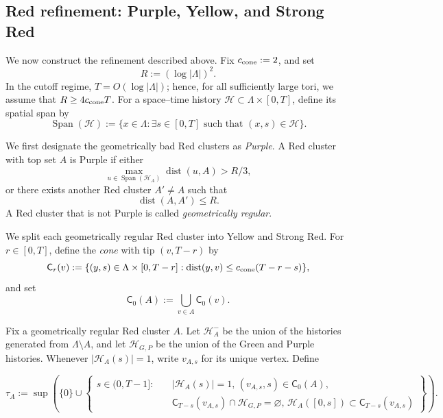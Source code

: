 \documentclass[letterpaper,11pt,reqno]{amsart}
\theoremstyle{definition}
\newcommand{\eset}{\varnothing}
\newcommand{\dist}{\mathrm{dist}}
\begin{document}
\subsection{Red refinement: Purple, Yellow, and Strong Red}
\label{subsec:yellowSR}

We now construct the refinement described above. 
%
Fix
\(c_{\rm cone}:=2\), and set
\[
        R:=(\log|\Lambda|)^2 .
\]
In the cutoff regime,
\(T=O(\log|\Lambda|)\); hence, for all sufficiently large tori, we assume that $R\ge 4c_{\rm cone}T$.
For a space--time history
\(\mathcal H\subset\Lambda\times[0,T]\), define its spatial span by
\[
        \operatorname{Span}(\mathcal H):=
        \{x\in\Lambda:\exists s\in[0,T]\text{ such that }(x,s)\in \mathcal H\}.
\]

We first designate the geometrically bad Red clusters as \emph{Purple}. A Red
cluster with top set \(A\) is Purple if either
\[
\max_{u\in\operatorname{Span}(\mathcal H_A)}
\operatorname{dist}(u,A)>R/3,
\]
or there exists another Red cluster \(A'\neq A\) such that
\[
\operatorname{dist}(A,A')\le R.
\]
A Red cluster that is not Purple is called
\emph{geometrically regular}.

We split each geometrically regular Red cluster into Yellow and Strong Red. For \(r\in[0,T]\), define the \emph{cone} with tip
\((v,T-r)\) by
\[
    \mathsf C_r(v)
    :=
    \{(y,s)\in\Lambda\times[0,T-r]:
      \dist(y,v)\le c_{\rm cone}(T-r-s)\},
\]
and set
\[
\mathsf C_0(A):=\bigcup_{v\in A}\mathsf C_0(v).
\]





Fix a geometrically regular Red cluster \(A\). Let \(\mathcal H_A^-\) be the
union of the histories generated from \(\Lambda\setminus A\), and let
\(\mathcal H_{G,P}\) be the union of the Green and Purple histories. Whenever
\(|\mathcal H_A(s)|=1\), write \(v_{A,s}\) for its unique vertex. Define

\[
\tau_A:=\sup\left(
\{0\}\cup
\left\{
\begin{aligned}
s\in(0,T-1]:\quad
&|\mathcal H_A(s)|=1,\,
(v_{A,s},s)\in\mathsf C_0(A),\\
&\mathsf C_{T-s}(v_{A,s})
  \cap\mathcal H_{G,P}=\eset,\,\mathcal H_A([0,s])
  \subset\mathsf C_{T-s}(v_{A,s})
\end{aligned}
\right\}
\right).
\]

\end{document}

